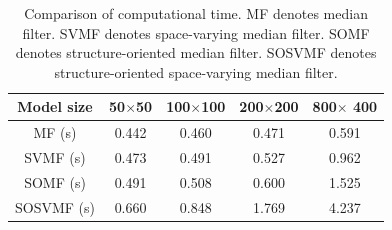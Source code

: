 \newpage
\listoftables
\newpage
\begin{table}[!ht]
\caption{Comparison of computational time. MF denotes median filter. SVMF denotes space-varying median filter. SOMF denotes structure-oriented median filter. SOSVMF denotes structure-oriented space-varying median filter.}
    \begin{center}
     \begin{tabular}{|c|c|c|c|c|} 
	  \hline Model size & 50$\times$50  &  100$\times$100 & 200$\times$200 & 800$\times$ 400\\ 
	  \hline MF (s) & 0.442 & 0.460 & 0.471 & 0.591\\
      \hline SVMF (s) & 0.473	& 0.491	   & 0.527   & 0.962	 \\ 
      \hline SOMF (s) & 0.491 & 0.508 	&0.600	 & 1.525\\
      \hline SOSVMF (s) & 0.660  & 0.848 	&1.769	 & 4.237\\
      \hline
    \end{tabular} 
   \end{center}
   \label{tbl:time}
\end{table}









